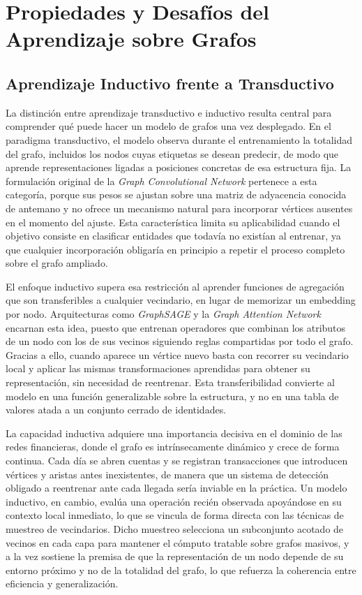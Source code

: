 \section{Propiedades y Desafíos del Aprendizaje sobre Grafos}

\subsection{Aprendizaje Inductivo frente a Transductivo}

La distinción entre aprendizaje transductivo e inductivo resulta central para comprender qué puede hacer un modelo de grafos una vez desplegado. En el paradigma transductivo, el modelo observa durante el entrenamiento la totalidad del grafo, incluidos los nodos cuyas etiquetas se desean predecir, de modo que aprende representaciones ligadas a posiciones concretas de esa estructura fija. La formulación original de la \textit{Graph Convolutional Network} pertenece a esta categoría, porque sus pesos se ajustan sobre una matriz de adyacencia conocida de antemano y no ofrece un mecanismo natural para incorporar vértices ausentes en el momento del ajuste. Esta característica limita su aplicabilidad cuando el objetivo consiste en clasificar entidades que todavía no existían al entrenar, ya que cualquier incorporación obligaría en principio a repetir el proceso completo sobre el grafo ampliado.

El enfoque inductivo supera esa restricción al aprender funciones de agregación que son transferibles a cualquier vecindario, en lugar de memorizar un embedding por nodo. Arquitecturas como \textit{GraphSAGE} y la \textit{Graph Attention Network} encarnan esta idea, puesto que entrenan operadores que combinan los atributos de un nodo con los de sus vecinos siguiendo reglas compartidas por todo el grafo. Gracias a ello, cuando aparece un vértice nuevo basta con recorrer su vecindario local y aplicar las mismas transformaciones aprendidas para obtener su representación, sin necesidad de reentrenar. Esta transferibilidad convierte al modelo en una función generalizable sobre la estructura, y no en una tabla de valores atada a un conjunto cerrado de identidades.

La capacidad inductiva adquiere una importancia decisiva en el dominio de las redes financieras, donde el grafo es intrínsecamente dinámico y crece de forma continua. Cada día se abren cuentas y se registran transacciones que introducen vértices y aristas antes inexistentes, de manera que un sistema de detección obligado a reentrenar ante cada llegada sería inviable en la práctica. Un modelo inductivo, en cambio, evalúa una operación recién observada apoyándose en su contexto local inmediato, lo que se vincula de forma directa con las técnicas de muestreo de vecindarios. Dicho muestreo selecciona un subconjunto acotado de vecinos en cada capa para mantener el cómputo tratable sobre grafos masivos, y a la vez sostiene la premisa de que la representación de un nodo depende de su entorno próximo y no de la totalidad del grafo, lo que refuerza la coherencia entre eficiencia y generalización.


